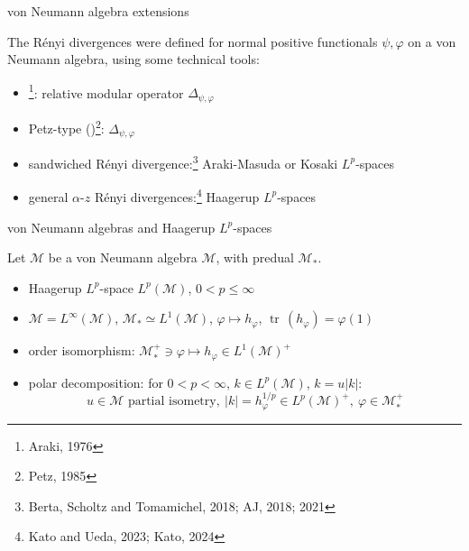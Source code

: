 \documentclass[mathserif]{beamer}
\newcommand{\<}{\langle}
\renewcommand{\>}{\rangle}
\newcommand{\Tr}{\operatorname{tr}\,}
\newcommand{\Me}{\mathcal M}
\begin{document}
\begin{frame}{von Neumann algebra extensions}

The R\'enyi divergences were defined for normal positive functionals $\psi,\varphi$ on a
von Neumann algebra, using some technical tools:

\medskip

\begin{itemize}
\item {}\footnote{Araki, 1976}:  relative modular operator
$\Delta_{\psi,\varphi}$
\item Petz-type ()\footnote{Petz, 1985}:
$\Delta_{\psi,\varphi}$
\item sandwiched R\'enyi divergence:\footnote{Berta, Scholtz and Tomamichel,
2018; AJ, 2018; 2021}
 Araki-Masuda or Kosaki $L^p$-spaces
\item general $\alpha$-$z$ R\'enyi divergences:\footnote{Kato and Ueda, 2023; Kato, 2024}
Haagerup $L^p$-spaces

 \end{itemize}


\end{frame}

\begin{frame}{von Neumann algebras and Haagerup $L^p$-spaces}


Let $\Me$ be a  von Neumann algebra $\Me$, with predual $\Me_*$.

\bigskip 

\begin{itemize}


\item Haagerup $L^p$-space $L^p(\Me)$, $0<p\le \infty$

\medskip

\item $\Me=L^\infty(\Me)$, $\Me_*\simeq L^1(\Me)$, $\varphi\mapsto h_\varphi$,
$\Tr(h_\varphi)=\varphi(1)$

\medskip

\item order isomorphism: $\Me_*^+\ni \varphi\mapsto h_\varphi \in L^1(\Me)^+$


\medskip

\item polar decomposition: for $0<p<\infty$,  $k\in L^p(\Me)$, $k=u|k|$:
\[
u\in \Me \text{ partial isometry},\  |k|=h_\varphi^{1/p}\in L^p(\Me)^+,\ \varphi\in
\Me_*^+
\]

\end{itemize}
\end{frame}
\end{document}
